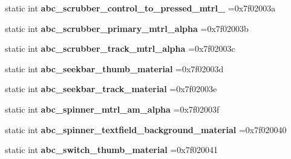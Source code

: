 \begin{DoxyCompactItemize}
static int {\bfseries abc\+\_\+scrubber\+\_\+control\+\_\+to\+\_\+pressed\+\_\+mtrl\+\_} =0x7f02003a
\item 
\mbox{\label{classandroid_1_1support_1_1v7_1_1appcompat_1_1R_1_1drawable_a2eef158d9a38827829d41fb77b3a8ef1}} 
static int {\bfseries abc\+\_\+scrubber\+\_\+primary\+\_\+mtrl\+\_\+alpha} =0x7f02003b
\item 
\mbox{\label{classandroid_1_1support_1_1v7_1_1appcompat_1_1R_1_1drawable_a55881be7c22886ad70008d666c44a6fb}} 
static int {\bfseries abc\+\_\+scrubber\+\_\+track\+\_\+mtrl\+\_\+alpha} =0x7f02003c
\item 
\mbox{\label{classandroid_1_1support_1_1v7_1_1appcompat_1_1R_1_1drawable_ac6ec5ff11416be7e7015763d95415f3d}} 
static int {\bfseries abc\+\_\+seekbar\+\_\+thumb\+\_\+material} =0x7f02003d
\item 
\mbox{\label{classandroid_1_1support_1_1v7_1_1appcompat_1_1R_1_1drawable_ab7bef3f2afe5fff13620b5d931b390a7}} 
static int {\bfseries abc\+\_\+seekbar\+\_\+track\+\_\+material} =0x7f02003e
\item 
\mbox{\label{classandroid_1_1support_1_1v7_1_1appcompat_1_1R_1_1drawable_a04bfa5f4959afb28c753f28ed96f8e76}} 
static int {\bfseries abc\+\_\+spinner\+\_\+mtrl\+\_\+am\+\_\+alpha} =0x7f02003f
\item 
\mbox{\label{classandroid_1_1support_1_1v7_1_1appcompat_1_1R_1_1drawable_a7fae0669850ff03c3aa6cff163ab597c}} 
static int {\bfseries abc\+\_\+spinner\+\_\+textfield\+\_\+background\+\_\+material} =0x7f020040
\item 
\mbox{\label{classandroid_1_1support_1_1v7_1_1appcompat_1_1R_1_1drawable_a0388e7a1b9befa2fa86ebc541fee2b48}} 
static int {\bfseries abc\+\_\+switch\+\_\+thumb\+\_\+material} =0x7f020041
\item 
\mbox{\label{classandroid_1_1support_1_1v7_1_1appcompat_1_1R_1_1drawable_ad28151b5b7b2c97ef74bf335e87b5b26}} 

\end{DoxyCompactItemize}
